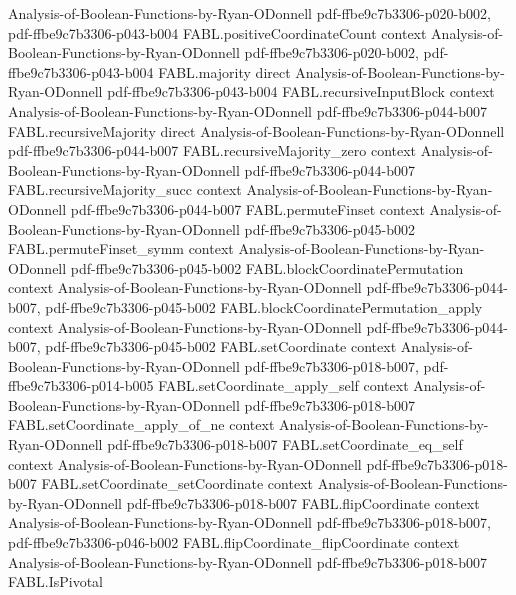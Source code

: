 \begin{theorem}
  {Analysis-of-Boolean-Functions-by-Ryan-ODonnell}
  {pdf-ffbe9c7b3306-p020-b002,
    pdf-ffbe9c7b3306-p043-b004}
\proofstep
  {FABL.positiveCoordinateCount}
  {context}
  {Analysis-of-Boolean-Functions-by-Ryan-ODonnell}
  {pdf-ffbe9c7b3306-p020-b002,
    pdf-ffbe9c7b3306-p043-b004}
\proofstep
  {FABL.majority}
  {direct}
  {Analysis-of-Boolean-Functions-by-Ryan-ODonnell}
  {pdf-ffbe9c7b3306-p043-b004}
\proofstep
  {FABL.recursiveInputBlock}
  {context}
  {Analysis-of-Boolean-Functions-by-Ryan-ODonnell}
  {pdf-ffbe9c7b3306-p044-b007}
\proofstep
  {FABL.recursiveMajority}
  {direct}
  {Analysis-of-Boolean-Functions-by-Ryan-ODonnell}
  {pdf-ffbe9c7b3306-p044-b007}
\proofstep
  {FABL.recursiveMajority_zero}
  {context}
  {Analysis-of-Boolean-Functions-by-Ryan-ODonnell}
  {pdf-ffbe9c7b3306-p044-b007}
\proofstep
  {FABL.recursiveMajority_succ}
  {context}
  {Analysis-of-Boolean-Functions-by-Ryan-ODonnell}
  {pdf-ffbe9c7b3306-p044-b007}
\proofstep
  {FABL.permuteFinset}
  {context}
  {Analysis-of-Boolean-Functions-by-Ryan-ODonnell}
  {pdf-ffbe9c7b3306-p045-b002}
\proofstep
  {FABL.permuteFinset_symm}
  {context}
  {Analysis-of-Boolean-Functions-by-Ryan-ODonnell}
  {pdf-ffbe9c7b3306-p045-b002}
\proofstep
  {FABL.blockCoordinatePermutation}
  {context}
  {Analysis-of-Boolean-Functions-by-Ryan-ODonnell}
  {pdf-ffbe9c7b3306-p044-b007,
    pdf-ffbe9c7b3306-p045-b002}
\proofstep
  {FABL.blockCoordinatePermutation_apply}
  {context}
  {Analysis-of-Boolean-Functions-by-Ryan-ODonnell}
  {pdf-ffbe9c7b3306-p044-b007,
    pdf-ffbe9c7b3306-p045-b002}
\proofstep
  {FABL.setCoordinate}
  {context}
  {Analysis-of-Boolean-Functions-by-Ryan-ODonnell}
  {pdf-ffbe9c7b3306-p018-b007,
    pdf-ffbe9c7b3306-p014-b005}
\proofstep
  {FABL.setCoordinate_apply_self}
  {context}
  {Analysis-of-Boolean-Functions-by-Ryan-ODonnell}
  {pdf-ffbe9c7b3306-p018-b007}
\proofstep
  {FABL.setCoordinate_apply_of_ne}
  {context}
  {Analysis-of-Boolean-Functions-by-Ryan-ODonnell}
  {pdf-ffbe9c7b3306-p018-b007}
\proofstep
  {FABL.setCoordinate_eq_self}
  {context}
  {Analysis-of-Boolean-Functions-by-Ryan-ODonnell}
  {pdf-ffbe9c7b3306-p018-b007}
\proofstep
  {FABL.setCoordinate_setCoordinate}
  {context}
  {Analysis-of-Boolean-Functions-by-Ryan-ODonnell}
  {pdf-ffbe9c7b3306-p018-b007}
\proofstep
  {FABL.flipCoordinate}
  {context}
  {Analysis-of-Boolean-Functions-by-Ryan-ODonnell}
  {pdf-ffbe9c7b3306-p018-b007,
    pdf-ffbe9c7b3306-p046-b002}
\proofstep
  {FABL.flipCoordinate_flipCoordinate}
  {context}
  {Analysis-of-Boolean-Functions-by-Ryan-ODonnell}
  {pdf-ffbe9c7b3306-p018-b007}
\proofstep
  {FABL.IsPivotal}

\end{theorem}
